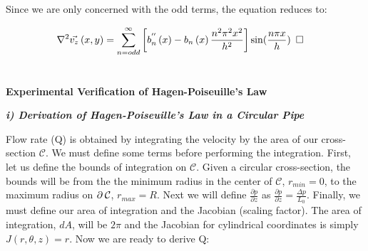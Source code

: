 \documentclass[titlepage]{article}
\begin{document}
Since we are only concerned with the odd terms, the equation reduces to:

\begin{align}
    \nabla^2\vec{v_{z}}\left(x,y\right) &= \sum_{n=odd}^{\infty}\left[b_{n}^{''}\left(x\right) - b_{n}\left(x\right)\displaystyle\frac{n^{2}\pi^{2}x^{2}}{h^2}\right]\sin(\displaystyle\frac{n\pi{x}}{h}) \hspace*{5pt} \square
\end{align}

\newpage
\section{}
\begin{center}
    \large
    \textbf{Experimental Verification of Hagen-Poiseuille's Law} \\
\end{center} 
\begin{center}
    \textbf{\emph{i) Derivation of Hagen-Poiseuille's Law in a Circular Pipe}}
\end{center}
\noindent Flow rate (Q) is obtained by integrating the velocity by the area of our cross-section $\mathcal{C}$. We must define some terms before performing the integration.
First, let us define the bounds of integration on $\mathcal{C}$. Given a circular cross-section, the bounds will be from the the minimum radius in the center of $\mathcal{C}$, $r_{min}=0$, to the maximum radius on $\partial\hspace*{2pt}\mathcal{C}$, $r_{max}=R$. Next we will define $\displaystyle\frac{\partial{p}}{\partial{z}}$ as $\displaystyle\frac{\partial{p}}{\partial{z}}=\displaystyle\frac{\Delta{p}}{L_{0}}$. Finally, we must define our area of integration and the Jacobian (scaling factor). The area of integration, $dA$, will be $2\pi$ and the Jacobian for cylindrical coordinates is simply $J\left(r,\theta,z\right)=r$. Now we are ready to derive Q:
\begingroup
    \addtolength\jot{6pt}
\end{document}
